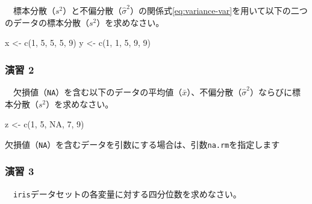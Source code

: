 \documentclass[
  12pt,
]{book}
\newenvironment{Shaded}{\begin{snugshade}}{\end{snugshade}}
\newcommand{\ConstantTok}[1]{\textcolor[rgb]{0.00,0.00,0.00}{#1}}
\newcommand{\DecValTok}[1]{\textcolor[rgb]{0.00,0.00,0.81}{#1}}
\newcommand{\FunctionTok}[1]{\textcolor[rgb]{0.00,0.00,0.00}{#1}}
\newcommand{\NormalTok}[1]{#1}
\newcommand{\OtherTok}[1]{\textcolor[rgb]{0.56,0.35,0.01}{#1}}
\begin{document}
　標本分散（\(s^2\)）と不偏分散（\(\hat{\sigma}^2\)）の関係式\eqref{eq:variance-var}を用いて以下の二つのデータの標本分散（\(s^2\)）を求めなさい。

\begin{Shaded}
\begin{Highlighting}[numbers=left,,]
\NormalTok{x }\OtherTok{\textless{}{-}} \FunctionTok{c}\NormalTok{(}\DecValTok{1}\NormalTok{, }\DecValTok{5}\NormalTok{, }\DecValTok{5}\NormalTok{, }\DecValTok{5}\NormalTok{, }\DecValTok{9}\NormalTok{)}
\NormalTok{y }\OtherTok{\textless{}{-}} \FunctionTok{c}\NormalTok{(}\DecValTok{1}\NormalTok{, }\DecValTok{1}\NormalTok{, }\DecValTok{5}\NormalTok{, }\DecValTok{9}\NormalTok{, }\DecValTok{9}\NormalTok{)}
\end{Highlighting}
\end{Shaded}

\hypertarget{ux6f14ux7fd2-2}{%
\subsubsection*{演習 2}\label{ux6f14ux7fd2-2}}

　欠損値（\texttt{NA}）を含む以下のデータの平均値（\(\bar{x}\)）、不偏分散（\(\hat{\sigma}^2\)）ならびに標本分散（\(s^2\)）を求めなさい。

\begin{Shaded}
\begin{Highlighting}[numbers=left,,]
\NormalTok{z }\OtherTok{\textless{}{-}} \FunctionTok{c}\NormalTok{(}\DecValTok{1}\NormalTok{, }\DecValTok{5}\NormalTok{, }\ConstantTok{NA}\NormalTok{, }\DecValTok{7}\NormalTok{, }\DecValTok{9}\NormalTok{)}
\end{Highlighting}
\end{Shaded}

\begin{hint-box}
欠損値（\texttt{NA}）を含むデータを引数にする場合は、引数\texttt{na.rm}を指定します

\end{hint-box}

\hypertarget{ux6f14ux7fd2-3}{%
\subsubsection*{演習 3}\label{ux6f14ux7fd2-3}}

　\texttt{iris}データセットの各変量に対する四分位数を求めなさい。

\newpage
\end{document}
